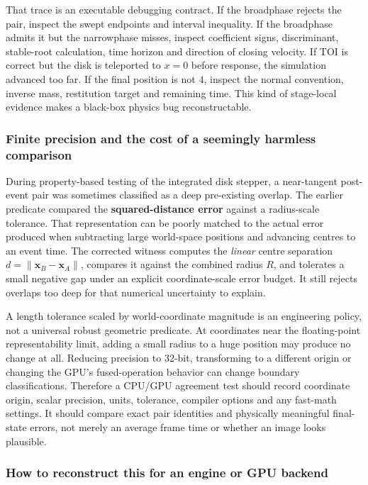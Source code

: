 That trace is an executable debugging contract. If the broadphase rejects the pair, inspect the swept endpoints and interval inequality. If the broadphase admits it but the narrowphase misses, inspect coefficient signs, discriminant, stable-root calculation, time horizon and direction of closing velocity. If TOI is correct but the disk is teleported to \(x=0\) before response, the simulation advanced too far. If the final position is not \(4\), inspect the normal convention, inverse mass, restitution target and remaining time. This kind of stage-local evidence makes a black-box physics bug reconstructable.

\subsubsection{Finite precision and the cost of a seemingly harmless comparison}\label{04-visual-computing-ii-ch026-finite-precision-and-the-cost-of-a-seemingly-harmless-comparison}

During property-based testing of the integrated disk stepper, a near-tangent post-event pair was sometimes classified as a deep pre-existing overlap. The earlier predicate compared the \textbf{squared-distance error} against a radius-scale tolerance. That representation can be poorly matched to the actual error produced when subtracting large world-space positions and advancing centres to an event time. The corrected witness computes the \emph{linear} centre separation \(d=\|\mathbf x_B-\mathbf x_A\|\), compares it against the combined radius \(R\), and tolerates a small negative gap under an explicit coordinate-scale error budget. It still rejects overlaps too deep for that numerical uncertainty to explain.

A length tolerance scaled by world-coordinate magnitude is an engineering policy, not a universal robust geometric predicate. At coordinates near the floating-point representability limit, adding a small radius to a huge position may produce no change at all. Reducing precision to 32-bit, transforming to a different origin or changing the GPU's fused-operation behavior can change boundary classifications. Therefore a CPU/GPU agreement test should record coordinate origin, scalar precision, units, tolerance, compiler options and any fast-math settings. It should compare exact pair identities and physically meaningful final-state errors, not merely an average frame time or whether an image looks plausible.

\subsubsection{How to reconstruct this for an engine or GPU backend}\label{04-visual-computing-ii-ch026-how-to-reconstruct-this-for-an-engine-or-gpu-backend}


